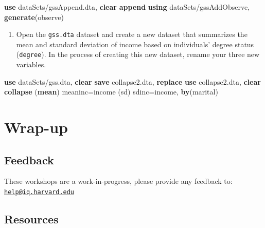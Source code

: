 \documentclass[
]{book}
\newenvironment{Shaded}{\begin{snugshade}}{\end{snugshade}}
\newcommand{\FunctionTok}[1]{\textcolor[rgb]{0.00,0.00,0.00}{#1}}
\newcommand{\KeywordTok}[1]{\textcolor[rgb]{0.13,0.29,0.53}{\textbf{#1}}}
\newcommand{\NormalTok}[1]{#1}
\providecommand{\tightlist}{%
  \setlength{\itemsep}{0pt}\setlength{\parskip}{0pt}}
\begin{document}
\begin{alert}
\begin{Shaded}
\begin{Highlighting}[]
\KeywordTok{use}\NormalTok{ dataSets/gssAppend.dta, }\KeywordTok{clear}
\KeywordTok{append} \KeywordTok{using}\NormalTok{ dataSets/gssAddObserve, }\KeywordTok{generate}\NormalTok{(observe) }
\end{Highlighting}
\end{Shaded}

\begin{enumerate}
\def\labelenumi{\arabic{enumi}.}
\setcounter{enumi}{3}
\tightlist
\item
  Open the \texttt{gss.dta} dataset and create a new dataset that summarizes the mean and standard deviation of income based on individuals' degree status (\texttt{degree}). In the process of creating this new dataset, rename your three new variables.
\end{enumerate}

\begin{Shaded}
\begin{Highlighting}[]
\KeywordTok{use}\NormalTok{ dataSets/gss.dta, }\KeywordTok{clear}
\KeywordTok{save}\NormalTok{ collapse2.dta, }\KeywordTok{replace}
\KeywordTok{use}\NormalTok{ collapse2.dta, }\KeywordTok{clear}
\KeywordTok{collapse}\NormalTok{ (}\KeywordTok{mean}\NormalTok{) meaninc=income (}\FunctionTok{sd}\NormalTok{) sdinc=income, }\KeywordTok{by}\NormalTok{(marital)}
\end{Highlighting}
\end{Shaded}

\end{alert}

\hypertarget{wrap-up-8}{%
\section{Wrap-up}\label{wrap-up-8}}

\hypertarget{feedback-8}{%
\subsection{Feedback}\label{feedback-8}}

These workshops are a work-in-progress, please provide any feedback to: \href{mailto:help@iq.harvard.edu}{\nolinkurl{help@iq.harvard.edu}}

\hypertarget{resources-11}{%
\subsection{Resources}\label{resources-11}}
\end{document}
